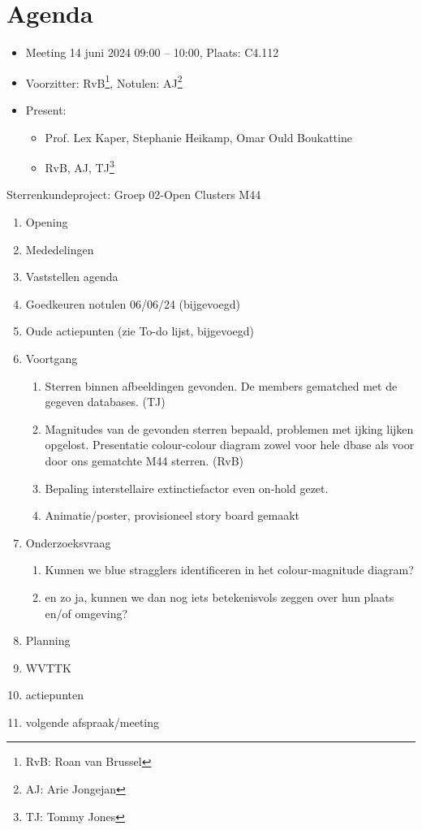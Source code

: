 \documentclass[11pt,a4paper]{article}
\begin{document}
\section{Agenda}
\begin{itemize}

\item Meeting 14 juni 2024 09:00 – 10:00, Plaats: C4.112

\item Voorzitter: RvB\footnote{RvB: Roan van Brussel}, Notulen: AJ\footnote{AJ: Arie Jongejan}
\item Present:
\begin{itemize} 
\item Prof. Lex Kaper, Stephanie Heikamp, Omar Ould Boukattine
\item RvB, AJ, TJ\footnote{TJ: Tommy Jones}
\end{itemize}
\end{itemize}
Sterrenkundeproject:  Groep 02-Open Clusters M44 

\begin{enumerate}
    \item Opening
    \item Mededelingen
    \item Vaststellen agenda
    \item Goedkeuren notulen 06/06/24 (bijgevoegd)
    \item Oude actiepunten (zie To-do lijst, bijgevoegd)
    \item Voortgang
    \begin{enumerate}
        \item Sterren binnen afbeeldingen gevonden. De members gematched met de gegeven databases. (TJ)
        \item Magnitudes van de gevonden sterren bepaald, problemen met ijking lijken opgelost. Presentatie colour-colour diagram zowel voor hele dbase als voor door ons gematchte M44 sterren. (RvB)
        \item Bepaling interstellaire extinctiefactor even on-hold gezet.
        \item Animatie/poster, provisioneel story board gemaakt
        
    \end{enumerate}
    \item Onderzoeksvraag
    \begin{enumerate}
    \item Kunnen we blue stragglers identificeren in het colour-magnitude diagram?
    \item en zo ja, kunnen we dan nog iets betekenisvols zeggen over hun plaats en/of omgeving?
    \end{enumerate}
     \item Planning
    \item WVTTK
    \item actiepunten
    \item volgende afspraak/meeting
    
\end{enumerate}
\end{document}
